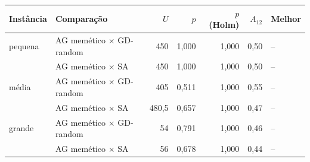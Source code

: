 \begin{tabular}{llrrrrl}
\toprule
Instância & Comparação & $U$ & $p$ & $p$ (Holm) & $A_{12}$ & Melhor \\
\midrule
pequena & AG memético $\times$ GD-random & 450 & 1,000 & 1,000 & 0,50 & -- \\
 & AG memético $\times$ SA & 450 & 1,000 & 1,000 & 0,50 & -- \\
\midrule
média & AG memético $\times$ GD-random & 405 & 0,511 & 1,000 & 0,55 & -- \\
 & AG memético $\times$ SA & 480,5 & 0,657 & 1,000 & 0,47 & -- \\
\midrule
grande & AG memético $\times$ GD-random & 54 & 0,791 & 1,000 & 0,46 & -- \\
 & AG memético $\times$ SA & 56 & 0,678 & 1,000 & 0,44 & -- \\
\bottomrule
\end{tabular}
